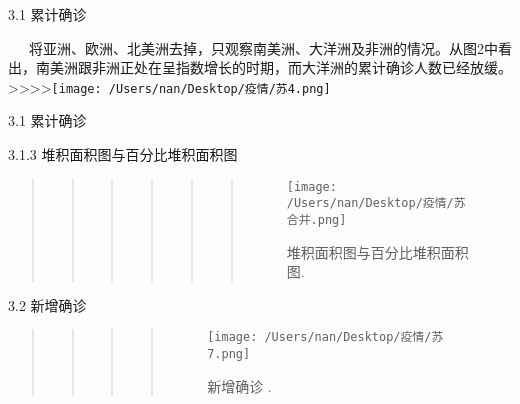 \documentclass[
  ignorenonframetext,
]{beamer}
\begin{document}
\begin{frame}{3.1 累计确诊}
\protect\hypertarget{section-20}{}

  将亚洲、欧洲、北美洲去掉，只观察南美洲、大洋洲及非洲的情况。从图2中看出，南美洲跟非洲正处在呈指数增长的时期，而大洋洲的累计确诊人数已经放缓。\\
\textgreater\textgreater\textgreater\textgreater{}\texttt{[image: /Users/nan/Desktop/疫情/苏4.png]}

\end{frame}

\begin{frame}{3.1 累计确诊}
\protect\hypertarget{section-21}{}

\begin{block}{3.1.3 堆积面积图与百分比堆积面积图}

\begin{quote}
\begin{quote}
\begin{quote}
\begin{quote}
\begin{quote}
\begin{quote}
\begin{figure}
\centering
\texttt{[image: /Users/nan/Desktop/疫情/苏合并.png]}
\caption{堆积面积图与百分比堆积面积图.}
\end{figure}
\end{quote}
\end{quote}
\end{quote}
\end{quote}
\end{quote}
\end{quote}

\end{block}

\end{frame}

\begin{frame}{3.2 新增确诊}
\protect\hypertarget{section-23}{}

\begin{quote}
\begin{quote}
\begin{quote}
\begin{quote}
\begin{figure}
\centering
\texttt{[image: /Users/nan/Desktop/疫情/苏7.png]}
\caption{新增确诊 .}
\end{figure}
\end{quote}
\end{quote}
\end{quote}
\end{quote}

\end{frame}
\end{document}

